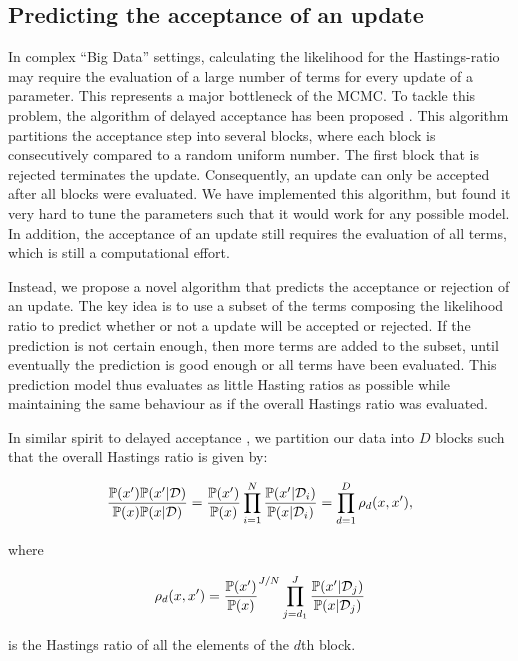 \documentclass[a4paper,11pt]{article}
\def\D{{\cal D}}
\def\p{\mathbb{P}}
\begin{document}
\subsection{Predicting the acceptance of an update}

In complex ``Big Data'' settings, calculating the likelihood for the Hastings-ratio may require the evaluation of a large number of terms for every update of a parameter. This represents a major bottleneck of the MCMC. To tackle this problem, the algorithm of delayed acceptance has been proposed \citep{banterle2015}. This algorithm partitions the acceptance step into several blocks, where each block is consecutively compared to a random uniform number. The first block that is rejected terminates the update. Consequently, an update can only be accepted after all blocks were evaluated. We have implemented this algorithm, but found it very hard to tune the parameters such that it would work for any possible model. In addition, the acceptance of an update still requires the evaluation of all terms, which is still a computational effort.

Instead, we propose a novel algorithm that predicts the acceptance or rejection of an update. The key idea is to use a subset of the terms composing the likelihood ratio to predict whether or not a update will be accepted or rejected. If the prediction is not certain enough, then more terms are added to the subset, until eventually the prediction is good enough or all terms have been evaluated. This prediction model thus evaluates as little Hasting ratios as possible while maintaining the same behaviour as if the overall Hastings ratio was evaluated.

In similar spirit to delayed acceptance \citep{banterle2015}, we partition our data into $D$ blocks such that the overall Hastings ratio is given by:

\begin{equation*}
 \frac{\p(x') \p(x' | \D)}{\p(x) \p(x | \D)} = \frac{\p(x')}{\p(x)} \prod_{i=1}^N \frac{\p(x' | \D_i)}{\p(x | \D_i)} = \prod_{d=1}^D \rho_d(x, x'),
\end{equation*}

where

\begin{equation}{\label{eq:blockLogH}}
 \rho_d(x, x') = \frac{\p(x')}{\p(x)}^{J/N} \prod_{j=d_1}^J \frac{\p(x' | \D_j)}{\p(x | \D_j)}
\end{equation}

is the Hastings ratio of all the elements of the $d$th block.
\end{document}
